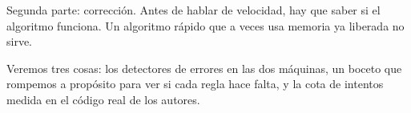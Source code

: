 Segunda parte: corrección. Antes de hablar de velocidad, hay que saber si el algoritmo funciona. Un algoritmo rápido que a veces usa memoria ya liberada no sirve.

Veremos tres cosas: los detectores de errores en las dos máquinas, un boceto que rompemos a propósito para ver si cada regla hace falta, y la cota de intentos medida en el código real de los autores.
